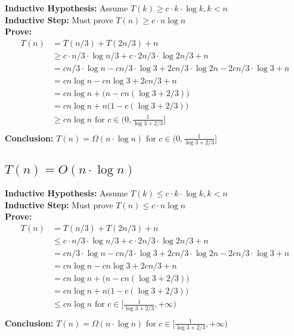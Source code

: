 \documentclass[a4paper]{article}
\begin{document}
\textbf{Inductive Hypothesis:} Assume $T(k)\geq c\cdot k \cdot \log{k}, k< n$\\
\textbf{Inductive Step:} Must prove $T(n)\geq c\cdot n\log{n}$\\
\textbf{Prove:}\\
\begin{align*}
    T(n) & = T(n/3) + T(2n/3) + n \\
    & \geq c\cdot n/3 \cdot \log{n/3} + c\cdot 2n/3 \cdot \log{2n/3} +n \\ 
    & = cn/3 \cdot \log{n} - cn/3 \cdot \log{3} + 2cn/3 \cdot \log{2n} - 2cn/3 \cdot \log{3} +n \\
    & = cn \log n - cn\log 3 + 2cn/3 + n \\
    & = cn \log n +\bigl(n-cn(\log 3 + 2/3)\bigr) \\
    & = cn \log n +n\bigl(1-c(\log 3 + 2/3)\bigr) \\
    & \geq cn \log n \text{ for } c\in (0,\frac{1}{\log 3 + 2/3}]\\
\end{align*}
\textbf{Conclusion: }$T(n)= \Omega(n\cdot \log n)\text{ for } c\in (0,\frac{1}{\log 3 + 2/3}] $

\subsection{$T(n)= O(n\cdot \log n)$}

\textbf{Inductive Hypothesis:} Assume $T(k)\leq c\cdot k \cdot \log{k}, k< n$\\
\textbf{Inductive Step:} Must prove $T(n)\leq c\cdot n\log{n}$\\
\textbf{Prove:}\\
\begin{align*}
    T(n) & = T(n/3) + T(2n/3) + n \\
    & \leq c\cdot n/3 \cdot \log{n/3} + c\cdot 2n/3 \cdot \log{2n/3} +n \\ 
    & = cn/3 \cdot \log{n} - cn/3 \cdot \log{3} + 2cn/3 \cdot \log{2n} - 2cn/3 \cdot \log{3} +n \\
    & = cn \log n - cn\log 3 + 2cn/3 + n \\
    & = cn \log n +\bigl(n-cn(\log 3 + 2/3)\bigr) \\
    & = cn \log n +n\bigl(1-c(\log 3 + 2/3)\bigr) \\
    & \leq cn \log n \text{ for } c\in [\frac{1}{\log 3 + 2/3}, +\infty)\\
\end{align*}
\textbf{Conclusion: }$T(n)= \Omega(n\cdot \log n)\text{ for } c\in [\frac{1}{\log 3 + 2/3}, +\infty) $
\end{document}
